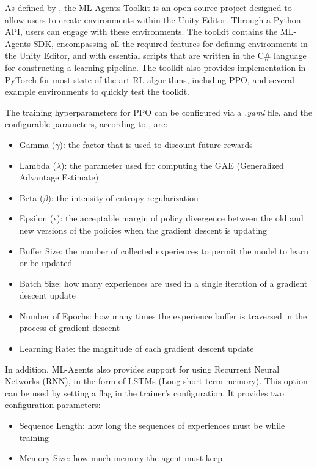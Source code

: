 As defined by \cite{juliani2020unityai}, the ML-Agents Toolkit is an open-source project designed to allow users to create environments within the Unity Editor. Through a Python API, users can engage with these environments. The toolkit contains the ML-Agents SDK, encompassing all the required features for defining environments in the Unity Editor, and with essential scripts that are written in the C\# language for constructing a learning pipeline. The toolkit also provides implementation in PyTorch for most state-of-the-art RL algorithms, including PPO, and several example environments to quickly test the toolkit.

The training hyperparameters for PPO can be configured via a \emph{.yaml} file, and the configurable parameters, according to \cite{mlagents_api_docs}, are:
\begin{itemize}
    \item Gamma ($\gamma$): the factor that is used to discount future rewards
    \item Lambda ($\lambda$): the parameter used for computing the GAE (Generalized Advantage Estimate)
    \item Beta ($\beta$): the intensity of entropy regularization
    \item Epsilon ($\epsilon$): the acceptable margin of policy divergence between the old and new versions of the policies when the gradient descent is updating
    \item Buffer Size: the number of collected experiences to permit the model to learn or be updated
    \item Batch Size: how many experiences are used in a single iteration of a gradient descent update
    \item Number of Epochs: how many times the experience buffer is traversed in the process of gradient descent
    \item Learning Rate: the magnitude of each gradient descent update
\end{itemize}

In addition, ML-Agents also provides support for using Recurrent Neural Networks (RNN), in the form of LSTMs (Long short-term memory). This option can be used by setting a flag in the trainer's configuration. It provides two configuration parameters:
\begin{itemize}
    \item Sequence Length: how long the sequences of experiences must be while training
    \item Memory Size: how much memory the agent must keep
\end{itemize}


